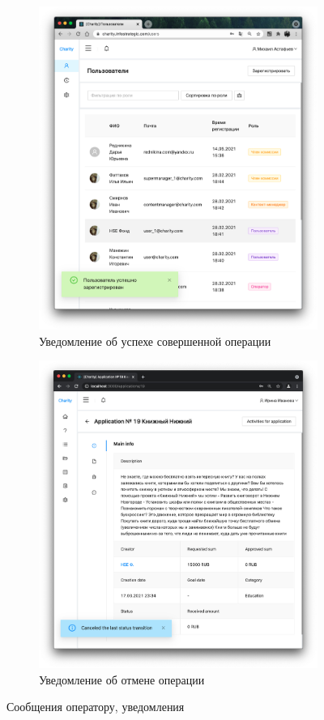 \documentclass[a4paper,12pt,reqno]{article}
\begin{document}
\begin{figure}[h!]
\begin{subfigure}[b]{0.3\linewidth}
			\includegraphics[width=\linewidth]{img/ro/reg_success.png}
			\caption{\label{pic: success} Уведомление об успехе совершенной операции}
		\end{subfigure}
		\begin{subfigure}[b]{0.315\linewidth}
			\includegraphics[width=\linewidth]{img/ro/info.png}
			\caption{\label{pic: wrong_code} Уведомление об отмене операции}
		\end{subfigure}
		\caption{\label{pic: wr} Сообщения оператору, уведомления}
	\end{figure}
	
\end{document}
